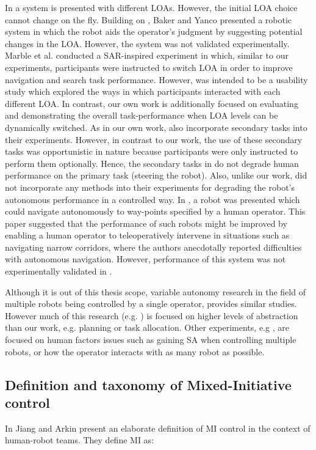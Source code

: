 \documentclass[a4paper,12pt,oneside,openright]{bhamthesis}
\begin{document}
In \cite{Goodrich2001} a system is presented with different LOAs. However, the initial LOA choice cannot change on the fly. Building on \cite{Bruemmer2002}, Baker and Yanco \cite{Baker2004b} presented a robotic system in which the robot aids the operator's judgment by suggesting potential changes in the LOA. However, the system was not validated experimentally. Marble et al. \cite{Marble2004} conducted a SAR-inspired experiment in which, similar to our experiments, participants were instructed to switch LOA in order to improve navigation and search task performance. However, \cite{Marble2004} was intended to be a usability study which explored the ways in which participants interacted with each different LOA. In contrast, our own work is additionally focused on evaluating and demonstrating the overall task-performance when LOA levels can be dynamically switched. As in our own work, \cite{Marble2004} also incorporate secondary tasks into their experiments. However, in contrast to our work, the use of these secondary tasks was opportunistic in nature because participants were only instructed to perform them optionally. Hence, the secondary tasks in \cite{Marble2004} do not degrade human performance on the primary task (steering the robot). Also, unlike our work, \cite{Marble2004} did not incorporate any methods into their experiments for degrading the robot's autonomous performance in a controlled way. In \cite{Ibanez-Guzman2004}, a robot was presented which could navigate autonomously to way-points specified by a human operator. This paper suggested that the performance of such robots might be improved by enabling a human operator to teleoperatively intervene in situations such as navigating narrow corridors, where the authors anecdotally reported difficulties with autonomous navigation. However, performance of this system was not experimentally validated in \cite{Ibanez-Guzman2004}.

Although it is out of this thesis scope, variable autonomy research in the field of multiple robots being controlled by a single operator, provides similar studies. However much of this research (e.g. \cite{Hardin2009,Goodrich2007b}) is focused on higher levels of abstraction than our work, e.g. planning or task allocation. Other experiments, e.g \cite{Riley2006, Valero-Gomez2011}, are focused on human factors issues such as gaining SA when controlling multiple robots, or how the operator interacts with as many robot as possible.


\subsection{Definition and taxonomy of Mixed-Initiative control}
\label{section:MI-taxonomy}
In \cite{Jiang2015} Jiang and Arkin present an elaborate definition of MI control in the context of human-robot teams. They define MI as:
\end{document}
